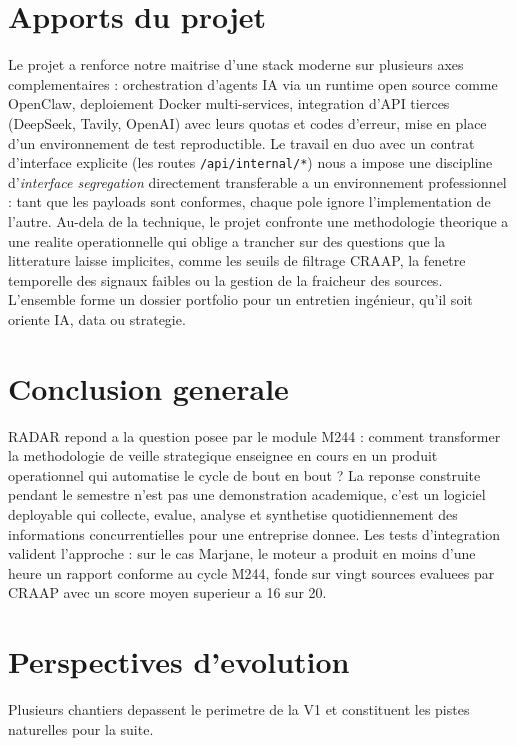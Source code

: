 \documentclass[12pt,a4paper,openany]{report}
\begin{document}
\section{Apports du projet}
\label{sec:apports}

Le projet a renforce notre maitrise d'une stack moderne sur plusieurs axes complementaires : orchestration d'agents IA via un runtime open source comme OpenClaw, deploiement Docker multi-services, integration d'API tierces (DeepSeek, Tavily, OpenAI) avec leurs quotas et codes d'erreur, mise en place d'un environnement de test reproductible. Le travail en duo avec un contrat d'interface explicite (les routes \texttt{/api/internal/*}) nous a impose une discipline d'\emph{interface segregation} directement transferable a un environnement professionnel : tant que les payloads sont conformes, chaque pole ignore l'implementation de l'autre. Au-dela de la technique, le projet confronte une methodologie theorique a une realite operationnelle qui oblige a trancher sur des questions que la litterature laisse implicites, comme les seuils de filtrage CRAAP, la fenetre temporelle des signaux faibles ou la gestion de la fraicheur des sources. L'ensemble forme un dossier portfolio pour un entretien ingénieur, qu'il soit oriente IA, data ou strategie.

\section{Conclusion generale}
\label{sec:conclusion-generale}

RADAR repond a la question posee par le module M244 : comment transformer la methodologie de veille strategique enseignee en cours en un produit operationnel qui automatise le cycle de bout en bout ? La reponse construite pendant le semestre n'est pas une demonstration academique, c'est un logiciel deployable qui collecte, evalue, analyse et synthetise quotidiennement des informations concurrentielles pour une entreprise donnee. Les tests d'integration valident l'approche : sur le cas Marjane, le moteur a produit en moins d'une heure un rapport conforme au cycle M244, fonde sur vingt sources evaluees par CRAAP avec un score moyen superieur a 16 sur 20.

\section{Perspectives d'evolution}
\label{sec:perspectives}

Plusieurs chantiers depassent le perimetre de la V1 et constituent les pistes naturelles pour la suite.
\end{document}
